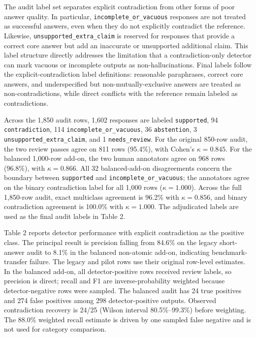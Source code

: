 \documentclass[11pt]{article}
\newcommand{\code}[1]{\texttt{#1}}
\begin{document}
The audit label set separates explicit contradiction from other forms of poor answer quality. In particular, \code{incomplete\_or\_vacuous} responses are not treated as successful answers, even when they do not explicitly contradict the reference. Likewise, \code{unsupported\_extra\_claim} is reserved for responses that provide a correct core answer but add an inaccurate or unsupported additional claim. This label structure directly addresses the limitation that a contradiction-only detector can mark vacuous or incomplete outputs as non-hallucinations. Final labels follow the explicit-contradiction label definitions: reasonable paraphrases, correct core answers, and underspecified but non-mutually-exclusive answers are treated as non-contradictions, while direct conflicts with the reference remain labeled as contradictions.

Across the 1,850 audit rows, 1,602 responses are labeled \code{supported}, 94 \code{contradiction}, 114 \code{incomplete\_or\_vacuous}, 36 \code{abstention}, 3 \code{unsupported\_extra\_claim}, and 1 \code{needs\_review}. For the original 850-row audit, the two review passes agree on 811 rows (95.4\%), with Cohen's $\kappa=0.845$. For the balanced 1,000-row add-on, the two human annotators agree on 968 rows (96.8\%), with $\kappa=0.866$. All 32 balanced-add-on disagreements concern the boundary between \code{supported} and \code{incomplete\_or\_vacuous}; the annotators agree on the binary contradiction label for all 1,000 rows ($\kappa=1.000$). Across the full 1,850-row audit, exact multiclass agreement is 96.2\% with $\kappa=0.856$, and binary contradiction agreement is 100.0\% with $\kappa=1.000$. The adjudicated labels are used as the final audit labels in Table 2.

Table 2 reports detector performance with explicit contradiction as the positive class. The principal result is precision falling from 84.6\% on the legacy short-answer audit to 8.1\% in the balanced non-atomic add-on, indicating benchmark-transfer failure. The legacy and pilot rows use their original row-level estimates. In the balanced add-on, all detector-positive rows received review labels, so precision is direct; recall and F1 are inverse-probability weighted because detector-negative rows were sampled. The balanced audit has 24 true positives and 274 false positives among 298 detector-positive outputs. Observed contradiction recovery is 24/25 (Wilson interval 80.5\%--99.3\%) before weighting. The 88.0\% weighted recall estimate is driven by one sampled false negative and is not used for category comparison.
\end{document}
